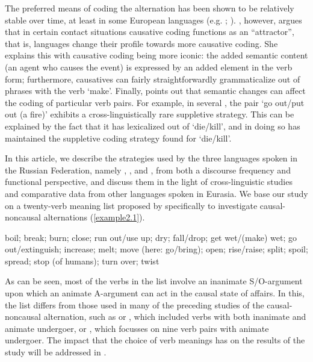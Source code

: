 \documentclass[output=paper,colorlinks,citecolor=brown]{langscibook}
\begin{document}
The preferred means of coding the alternation has been shown to be relatively stable over time, at least in some European languages (e.g. \citealt[314--317]{Comrie2006}; \citealt[45]{Plank2015}). \citet{Nichols2018}, however, argues that in certain contact situations causative coding functions as an ``attractor'', that is, languages change their profile towards more causative coding. She explains this with causative coding being more iconic: the added semantic content (an agent who causes the event) is expressed by an added element in the verb form; furthermore, causatives can fairly straightforwardly grammaticalize out of phrases with the verb ‘make’. Finally, \citet{Creisselstoappear} points out that semantic changes can affect the coding of particular verb pairs. For example, in several , the pair ‘go out/put out (a fire)’ exhibits a cross-linguistically rare suppletive strategy. This can be explained by the fact that it has lexicalized out of ‘die/kill’, and in doing so has maintained the suppletive coding strategy found for ‘die/kill’.

In this article, we describe the strategies used by the three  languages spoken in the Russian Federation, namely , , and , from both a discourse frequency and functional perspective, and discuss them in the light of cross-linguistic studies and comparative data from other languages spoken in Eurasia. We base our study on a twenty-verb meaning list proposed by \citet{Creissels2018} specifically to investigate causal-noncausal alternations (\ref{example2.1}).

\ea
\label{example2.1}
boil; break; burn; close; run out/use up; dry; fall/drop; get wet/(make) wet; go out/extinguish; increase; melt; move (here: go/bring); open; rise/raise; split; spoil; spread; stop (of humans); turn over; twist
\z

As can be seen, most of the verbs in the list involve an inanimate S/O-argument upon which an animate A-argument can act in the causal state of affairs. In this, the list differs from those used in many of the preceding studies of the causal-noncausal alternation, such as \citet{Haspelmath1993} or \citet{Nichols2004}, which included verbs with both inanimate and animate undergoer, or \citet{Nichols2018}, which focusses on nine verb pairs with animate undergoer. The impact that the choice of verb meanings has on the results of the study will be addressed in .
\end{document}
